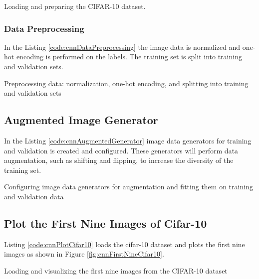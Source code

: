 \begin{code}[h!]
	    
	\caption{Loading and preparing the CIFAR-10 dataset.}
	\label{code:cnnLoadCifar}
\end{code}

\subsubsection{Data Preprocessing}

In the Listing \ref{code:cnnDataPreprocessing} the image data is normalized and one-hot encoding is performed on the labels. The training set is split into training and validation sets.

\begin{code}[h!]
	    
	\caption{Preprocessing data: normalization, one-hot encoding, and splitting into training and validation sets}
	\label{code:cnnDataPreprocessing}
\end{code}

\subsection{Augmented Image Generator}

In the Listing \ref{code:cnnAugmentedGenerator} image data generators for training and validation is created and configured. These generators will perform data augmentation, such as shifting and flipping, to increase the diversity of the training set.

\begin{code}[h!]
	    
	\caption{Configuring image data generators for augmentation and fitting them on training and validation data}
	\label{code:cnnAugmentedGenerator}
\end{code}

\subsection{Plot the First Nine Images of Cifar-10}

Listing \ref{code:cnnPlotCifar10} loads the cifar-10 dataset and plots the first nine images as shown in Figure \ref{fig:cnnFirstNineCifar10}.

\begin{code}[h!]
	    
	\caption{Loading and visualizing the first nine images from the CIFAR-10 dataset}
	\label{code:cnnPlotCifar10}
\end{code}


